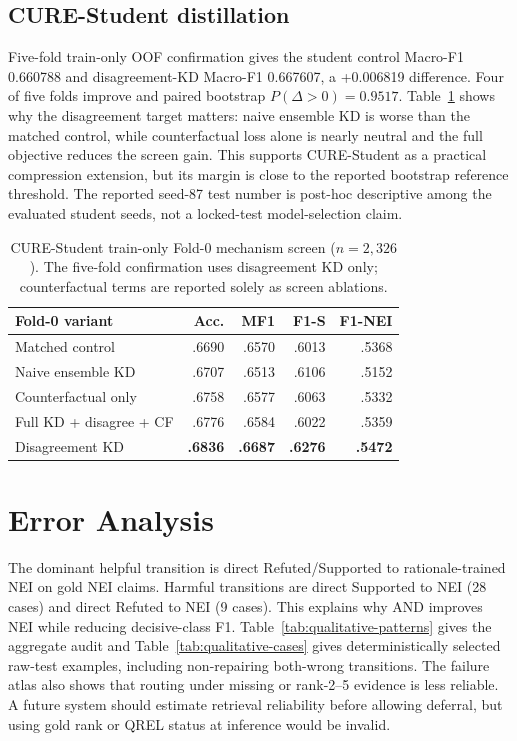 \documentclass[11pt]{article}
\begin{document}
\subsection{\textsc{CURE}-Student distillation}
Five-fold train-only OOF confirmation gives the student control Macro-F1 0.660788 and disagreement-KD Macro-F1 0.667607, a +0.006819 difference. Four of five folds improve and paired bootstrap $P(\Delta>0)=0.9517$. Table~\ref{tab:b19-ablation} shows why the disagreement target matters: naive ensemble KD is worse than the matched control, while counterfactual loss alone is nearly neutral and the full objective reduces the screen gain. This supports \textsc{CURE}-Student as a practical compression extension, but its margin is close to the reported bootstrap reference threshold. The reported seed-87 test number is post-hoc descriptive among the evaluated student seeds, not a locked-test model-selection claim.

\begin{table}[t]
\centering\scriptsize
\begin{tabular}{@{}lrrrr@{}}
\toprule
Fold-0 variant & Acc. & MF1 & F1-S & F1-NEI\\
\midrule
Matched control & .6690 & .6570 & .6013 & .5368\\
Naive ensemble KD & .6707 & .6513 & .6106 & .5152\\
Counterfactual only & .6758 & .6577 & .6063 & .5332\\
Full KD + disagree + CF & .6776 & .6584 & .6022 & .5359\\
Disagreement KD & \textbf{.6836} & \textbf{.6687} & \textbf{.6276} & \textbf{.5472}\\
\bottomrule
\end{tabular}
\caption{\textsc{CURE}-Student train-only Fold-0 mechanism screen ($n=2{,}326$). The five-fold confirmation uses disagreement KD only; counterfactual terms are reported solely as screen ablations.}\label{tab:b19-ablation}
\end{table}

\section{Error Analysis}
The dominant helpful transition is direct Refuted/Supported to rationale-trained \textsc{NEI} on gold \textsc{NEI} claims. Harmful transitions are direct Supported to \textsc{NEI} (28 cases) and direct Refuted to \textsc{NEI} (9 cases). This explains why AND improves \textsc{NEI} while reducing decisive-class F1. Table~\ref{tab:qualitative-patterns} gives the aggregate audit and Table~\ref{tab:qualitative-cases} gives deterministically selected raw-test examples, including non-repairing both-wrong transitions. The failure atlas also shows that routing under missing or rank-2--5 evidence is less reliable. A future system should estimate retrieval reliability before allowing deferral, but using gold rank or QREL status at inference would be invalid.
\end{document}
